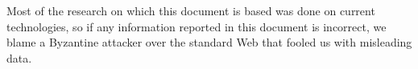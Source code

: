 \documentclass[mscthesis]{usiinfthesis}
\begin{document}
Most of the research on which this document is based was done on current technologies, so if any information reported in this document is incorrect, we blame a Byzantine attacker over the standard Web that fooled us with misleading data.


\backmatter


%
%


\end{document}
